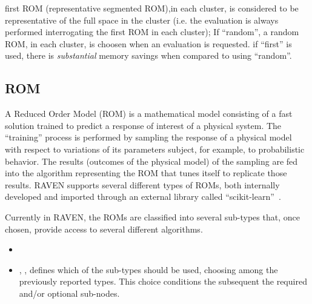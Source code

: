 {\begin{itemize}
        first ROM (representative segmented ROM),in each cluster, is considered to
         be representative of the full space in the cluster (i.e. the evaluation is always performed
         interrogating the first ROM in each cluster); If ``random'', a random ROM, in each cluster,
         is choosen when an evaluation is requested.
	 \nb if ``first'' is used, there is \emph{substantial} memory savings when compared to using
	 ``random''.
    \end{itemize}
}

\subsection{ROM}
\label{subsec:models_ROM}
A Reduced Order Model (ROM) is a mathematical model consisting of a fast
solution trained to predict a response of interest of a physical system.
%
The ``training'' process is performed by sampling the response of a physical
model with respect to variations of its parameters subject, for example, to
probabilistic behavior.
%
The results (outcomes of the physical model) of the sampling are fed into the
algorithm representing the ROM that tunes itself to replicate those results.
%
RAVEN supports several different types of ROMs, both internally developed and
imported through an external library called ``scikit-learn''~\cite{SciKitLearn}.

Currently in RAVEN, the ROMs are classified into several sub-types that, once chosen,
provide access to several different algorithms.
%
%
\attrsIntro
%
\vspace{-5mm}
\begin{itemize}
  \itemsep0em
  \item \nameDescription
  \item {}, , defines which of
  the sub-types should be used, choosing among the previously reported
  types.
  This choice conditions the subsequent the required and/or optional
   sub-nodes.
\end{itemize}
\vspace{-5mm}

